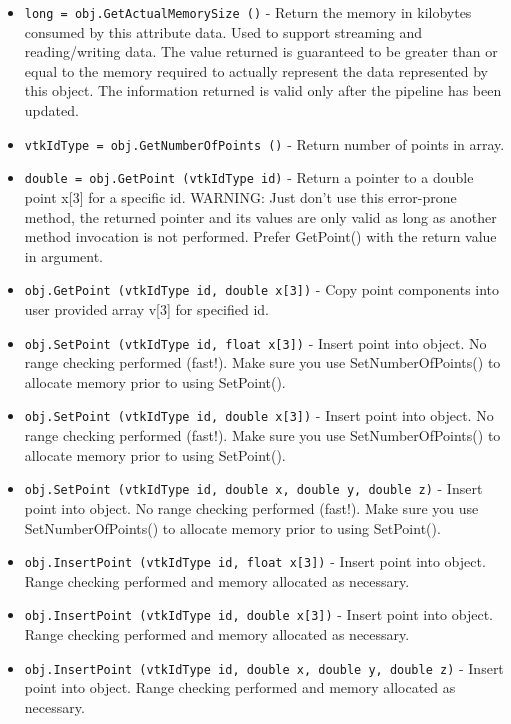 \begin{itemize}
\item  \verb|long = obj.GetActualMemorySize ()| -  Return the memory in kilobytes consumed by this attribute data. 
 Used to support streaming and reading/writing data. The value 
 returned is guaranteed to be greater than or equal to the 
 memory required to actually represent the data represented 
 by this object. The information returned is valid only after
 the pipeline has been updated.

\item  \verb|vtkIdType = obj.GetNumberOfPoints ()| -  Return number of points in array.

\item  \verb|double = obj.GetPoint (vtkIdType id)| -  Return a pointer to a double point x[3] for a specific id.
 WARNING: Just don't use this error-prone method, the returned pointer
 and its values are only valid as long as another method invocation is not
 performed. Prefer GetPoint() with the return value in argument.

\item  \verb|obj.GetPoint (vtkIdType id, double x[3])| -  Copy point components into user provided array v[3] for specified
 id.

\item  \verb|obj.SetPoint (vtkIdType id, float x[3])| -  Insert point into object. No range checking performed (fast!).
 Make sure you use SetNumberOfPoints() to allocate memory prior
 to using SetPoint().

\item  \verb|obj.SetPoint (vtkIdType id, double x[3])| -  Insert point into object. No range checking performed (fast!).
 Make sure you use SetNumberOfPoints() to allocate memory prior
 to using SetPoint().

\item  \verb|obj.SetPoint (vtkIdType id, double x, double y, double z)| -  Insert point into object. No range checking performed (fast!).
 Make sure you use SetNumberOfPoints() to allocate memory prior
 to using SetPoint().

\item  \verb|obj.InsertPoint (vtkIdType id, float x[3])| -  Insert point into object. Range checking performed and memory
 allocated as necessary.

\item  \verb|obj.InsertPoint (vtkIdType id, double x[3])| -  Insert point into object. Range checking performed and memory
 allocated as necessary.

\item  \verb|obj.InsertPoint (vtkIdType id, double x, double y, double z)| -  Insert point into object. Range checking performed and memory
 allocated as necessary.


\end{itemize}
